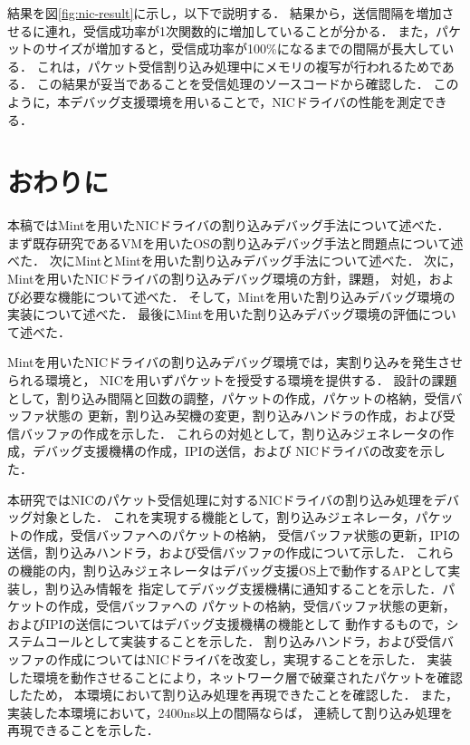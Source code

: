 \documentclass[submit,techreq,noauthor,dvipdfmx]{ipsj}
\begin{document}
結果を図\ref{fig:nic-result}に示し，以下で説明する．
結果から，送信間隔を増加させるに連れ，受信成功率が1次関数的に増加していることが分かる．
また，パケットのサイズが増加すると，受信成功率が100\%になるまでの間隔が長大している．
これは，パケット受信割り込み処理中にメモリの複写が行われるためである．
この結果が妥当であることを受信処理のソースコードから確認した．
このように，本デバッグ支援環境を用いることで，NICドライバの性能を測定できる．

\section{おわりに}\label{chap:conclusion}

本稿ではMintを用いたNICドライバの割り込みデバッグ手法について述べた．
まず既存研究であるVMを用いたOSの割り込みデバッグ手法と問題点について述べた．
次にMintとMintを用いた割り込みデバッグ手法について述べた．
次に，Mintを用いたNICドライバの割り込みデバッグ環境の方針，課題，
対処，および必要な機能について述べた．
そして，Mintを用いた割り込みデバッグ環境の実装について述べた．
最後にMintを用いた割り込みデバッグ環境の評価について述べた．

Mintを用いたNICドライバの割り込みデバッグ環境では，実割り込みを発生させられる環境と，
NICを用いずパケットを授受する環境を提供する．
設計の課題として，割り込み間隔と回数の調整，パケットの作成，パケットの格納，受信バッファ状態の
更新，割り込み契機の変更，割り込みハンドラの作成，および受信バッファの作成を示した．
これらの対処として，割り込みジェネレータの作成，デバッグ支援機構の作成，IPIの送信，および
NICドライバの改変を示した．

本研究ではNICのパケット受信処理に対するNICドライバの割り込み処理をデバッグ対象とした．
これを実現する機能として，割り込みジェネレータ，パケットの作成，受信バッファへのパケットの格納，
受信バッファ状態の更新，IPIの送信，割り込みハンドラ，および受信バッファの作成について示した．
これらの機能の内，割り込みジェネレータはデバッグ支援OS上で動作するAPとして実装し，割り込み情報を
指定してデバッグ支援機構に通知することを示した．パケットの作成，受信バッファへの
パケットの格納，受信バッファ状態の更新，およびIPIの送信についてはデバッグ支援機構の機能として
動作するもので，システムコールとして実装することを示した．
割り込みハンドラ，および受信バッファの作成についてはNICドライバを改変し，実現することを示した．
実装した環境を動作させることにより，ネットワーク層で破棄されたパケットを確認したため，
本環境において割り込み処理を再現できたことを確認した．
また，実装した本環境において，2400ns以上の間隔ならば，
連続して割り込み処理を再現できることを示した．


\end{document}
